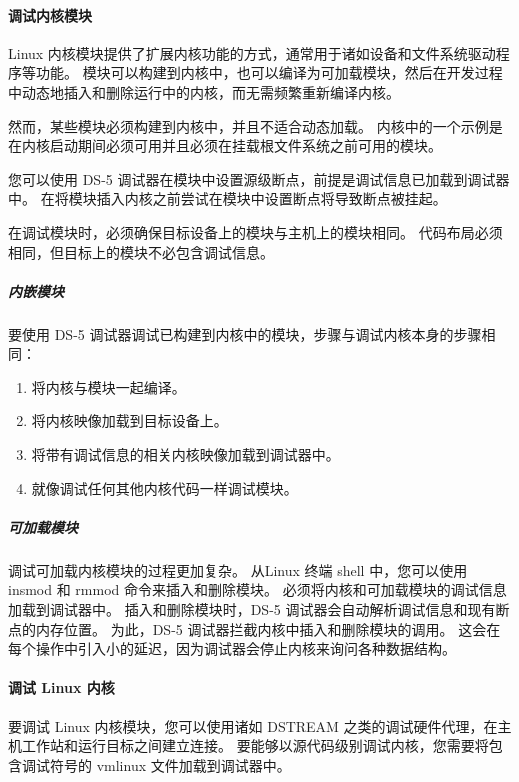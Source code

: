 \paragraph*{调试内核模块}

Linux 内核模块提供了扩展内核功能的方式，通常用于诸如设备和文件系统驱动程序等功能。
模块可以构建到内核中，也可以编译为可加载模块，然后在开发过程中动态地插入和删除运行中的内核，而无需频繁重新编译内核。

然而，某些模块必须构建到内核中，并且不适合动态加载。
内核中的一个示例是在内核启动期间必须可用并且必须在挂载根文件系统之前可用的模块。

您可以使用 DS-5 调试器在模块中设置源级断点，前提是调试信息已加载到调试器中。
在将模块插入内核之前尝试在模块中设置断点将导致断点被挂起。

在调试模块时，必须确保目标设备上的模块与主机上的模块相同。
代码布局必须相同，但目标上的模块不必包含调试信息。

\subparagraph*{内嵌模块}

要使用 DS-5 调试器调试已构建到内核中的模块，步骤与调试内核本身的步骤相同：

\begin{enumerate}
\item
  将内核与模块一起编译。
\item
  将内核映像加载到目标设备上。
\item
  将带有调试信息的相关内核映像加载到调试器中。
\item
  就像调试任何其他内核代码一样调试模块。
\end{enumerate}

\subparagraph*{可加载模块}

调试可加载内核模块的过程更加复杂。
从Linux 终端 shell 中，您可以使用 insmod 和 rmmod 命令来插入和删除模块。
必须将内核和可加载模块的调试信息加载到调试器中。
插入和删除模块时，DS-5 调试器会自动解析调试信息和现有断点的内存位置。
为此，DS-5 调试器拦截内核中插入和删除模块的调用。
这会在每个操作中引入小的延迟，因为调试器会停止内核来询问各种数据结构。

\paragraph*{调试 Linux 内核}

要调试 Linux 内核模块，您可以使用诸如 DSTREAM 之类的调试硬件代理，在主机工作站和运行目标之间建立连接。
要能够以源代码级别调试内核，您需要将包含调试符号的 vmlinux 文件加载到调试器中。



